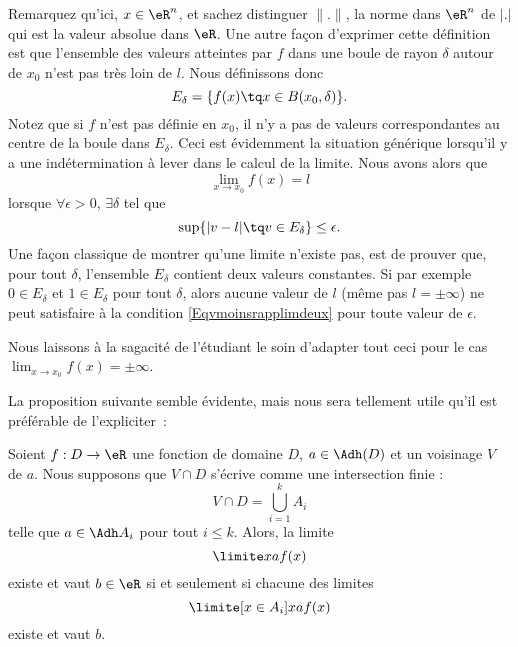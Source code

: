 Remarquez qu'ici, $x\in\eR^n$, et sachez distinguer $\| . \|$, la norme dans $\eR^n$ de $| . |$ qui est la valeur absolue dans $\eR$. Une autre façon d'exprimer cette définition est que l'ensemble des valeurs atteintes par $f$ dans une boule de rayon $\delta$ autour de $x_0$ n'est pas très loin de $l$. Nous définissons donc
\begin{equation}
    E_{\delta}=\{ f(x)\tq x\in B(x_0,\delta) \}.
\end{equation}
Notez que si $f$ n'est pas définie en $x_0$, il n'y a pas de valeurs correspondantes au centre de la boule dans $E_{\delta}$. Ceci est évidemment la situation générique lorsqu'il y a une indétermination à lever dans le calcul de la limite. Nous avons alors que
\begin{equation}
    \lim_{x\to x_0}f(x)=l
\end{equation}
lorsque $\forall\epsilon>0$, $\exists\delta$ tel que
\begin{equation}        \label{Eqvmoinsrapplimdeux}
    \sup\{ | v-l |\tq v\in E_{\delta} \}\leq\epsilon.
\end{equation}
Une façon classique de montrer qu'une limite n'existe pas, est de prouver que, pour tout $\delta$, l'ensemble $E_{\delta}$ contient deux valeurs constantes. Si par exemple $0\in E_{\delta}$ et $1\in E_{\delta}$ pour tout $\delta$, alors aucune valeur de $l$ (même pas $l=\pm\infty$) ne peut satisfaire à la condition \eqref{Eqvmoinsrapplimdeux} pour toute valeur de $\epsilon$.

Nous laissons à la sagacité de l'étudiant le soin d'adapter tout ceci pour le cas $\lim_{x\to x_0}f(x)=\pm\infty$.

La proposition suivante semble évidente, mais nous sera tellement
utile qu'il est préférable de l'expliciter~:
\begin{proposition}     \label{PROPooPOAQooPmxEtb}
    Soient $f : D \to \eR$ une fonction de domaine \( D\), \( a\in\Adh(D)\) et un voisinage \( V\) de \( a\). Nous supposons que \( V\cap D\) s'écrive comme une intersection finie :
  \begin{equation*}
    V\cap D = \bigcup_{i=1}^k A_i
  \end{equation*}
  telle que $a \in \Adh A_i$ pour tout $i \leq k$. Alors, la limite
  \begin{equation}      \label{EQooEXELooHccCGw}
    \limite x a f(x)
  \end{equation}
  existe et vaut $b\in \eR$ si et seulement si chacune des limites
  \begin{equation}
    \limite[x \in A_i] x a f(x)
  \end{equation}
  existe et vaut $b$.
\end{proposition}

